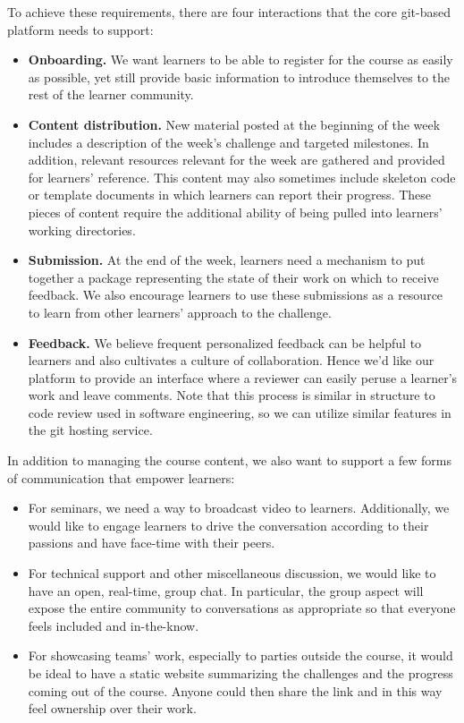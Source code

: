 \documentclass[12pt,twoside,vi]{mitthesis}
\begin{document}
To achieve these requirements, there are four interactions that the core git-based platform needs to support:
\begin{itemize}
\item \textbf{Onboarding.} We want learners to be able to register for the course as easily as possible, yet still provide basic information to introduce themselves to the rest of the learner community. 
\item \textbf{Content distribution.} New material posted at the beginning of the week includes a description of the week’s challenge and targeted milestones. In addition, relevant resources relevant for the week are gathered and provided for learners’ reference. This content may also sometimes include skeleton code or template documents in which learners can report their progress. These pieces of content require the additional ability of being pulled into learners’ working directories.
\item \textbf{Submission.} At the end of the week, learners need a mechanism to put together a package representing the state of their work on which to receive feedback. We also encourage learners to use these submissions as a resource to learn from other learners’ approach to the challenge.
\item \textbf{Feedback.} We believe frequent personalized feedback can be helpful to learners and also cultivates a culture of collaboration. Hence we’d like our platform to provide an interface where a reviewer can easily peruse a learner’s work and leave comments. Note that this process is similar in structure to code review used in software engineering, so we can utilize similar features in the git hosting service.
\end{itemize}

In addition to managing the course content, we also want to support a few forms of communication that empower learners:
\begin{itemize}
\item For seminars, we need a way to broadcast video to learners. Additionally, we would like to engage learners to drive the conversation according to their passions and have face-time with their peers.
\item For technical support and other miscellaneous discussion, we would like to have an open, real-time, group chat. In particular, the group aspect will expose the entire community to conversations as appropriate so that everyone feels included and in-the-know.
\item For showcasing teams' work, especially to parties outside the course, it would be ideal to have a static website summarizing the challenges and the progress coming out of the course. Anyone could then share the link and in this way feel ownership over their work.
\end{itemize}
\end{document}
